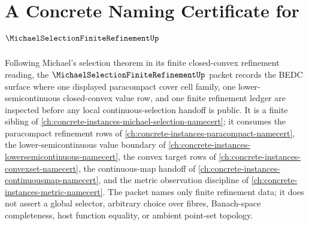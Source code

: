 \chapter{A Concrete Naming Certificate for $\MichaelSelectionFiniteRefinementUp$}
\label{ch:concrete-instances-michael-selection-finite-refinement-namecert}

Following Michael's selection theorem in its finite closed-convex refinement reading, the $\MichaelSelectionFiniteRefinementUp$ packet records the BEDC surface where one displayed paracompact cover cell family, one lower-semicontinuous closed-convex value row, and one finite refinement ledger are inspected before any local continuous-selection handoff is public. It is a finite sibling of \autoref{ch:concrete-instances-michael-selection-namecert}; it consumes the paracompact refinement rows of \autoref{ch:concrete-instances-paracompact-namecert}, the lower-semicontinuous value boundary of \autoref{ch:concrete-instances-lowersemicontinuous-namecert}, the convex target rows of \autoref{ch:concrete-instances-convexset-namecert}, the continuous-map handoff of \autoref{ch:concrete-instances-continuousmap-namecert}, and the metric observation discipline of \autoref{ch:concrete-instances-metric-namecert}. The packet names only finite refinement data; it does not assert a global selector, arbitrary choice over fibres, Banach-space completeness, host function equality, or ambient point-set topology.

